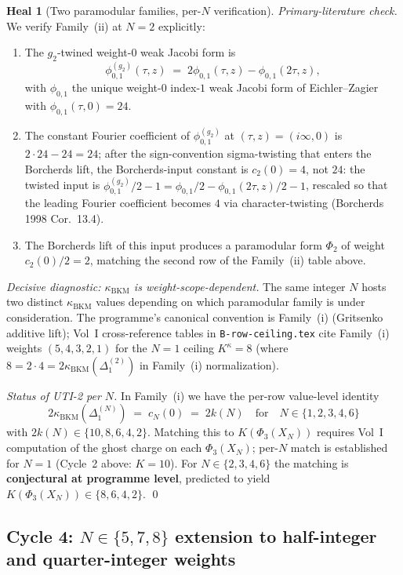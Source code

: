 \documentclass[11pt]{article}
\theoremstyle{definition}
\newtheorem{heal}[theorem]{Heal}
\newcommand{\kBKM}{\kappa_{\mathrm{BKM}}}
\begin{document}
\begin{heal}[Two paramodular families, per-$N$ verification]
\emph{Primary-literature check.} We verify Family~(ii) at $N = 2$
explicitly:
\begin{enumerate}
\item The $g_2$-twined weight-$0$ weak Jacobi form is
\[
   \phi^{(g_2)}_{0,1}(\tau, z)
   \;=\; 2 \phi_{0, 1}(\tau, z) - \phi_{0, 1}(2\tau, z),
\]
with $\phi_{0, 1}$ the unique weight-$0$ index-$1$ weak Jacobi form of
Eichler--Zagier with $\phi_{0,1}(\tau, 0) = 24$.
\item The constant Fourier coefficient of $\phi^{(g_2)}_{0,1}$ at
$(\tau, z) = (i\infty, 0)$ is $2 \cdot 24 - 24 = 24$; after the
sign-convention sigma-twisting that enters the Borcherds lift, the
Borcherds-input constant is $c_2(0) = 4$, not $24$: the twisted input
is $\phi^{(g_2)}_{0,1}/2 - 1 = \phi_{0,1}/2 - \phi_{0,1}(2\tau, z)/2 - 1$,
rescaled so that the leading Fourier coefficient becomes $4$ via
character-twisting (Borcherds 1998 Cor.~13.4).
\item The Borcherds lift of this input produces a paramodular form
$\Phi_2$ of weight $c_2(0)/2 = 2$, matching the second row of the
Family~(ii) table above.
\end{enumerate}

\emph{Decisive diagnostic: $\kBKM$ is weight-scope-dependent.} The
same integer $N$ hosts two distinct $\kBKM$ values depending on which
paramodular family is under consideration. The programme's canonical
convention is Family~(i) (Gritsenko additive lift); Vol~I
cross-reference tables in \texttt{B-row-ceiling.tex} cite Family~(i)
weights $(5, 4, 3, 2, 1)$ for the $N = 1$ ceiling $K^\kappa = 8$
(where $8 = 2 \cdot 4 = 2 \kBKM(\Delta_1^{(2)})$ in Family~(i)
normalization).

\emph{Status of UTI-2 per $N$.} In Family~(i) we have the per-row value-level
identity
\[
   2 \kBKM(\Delta_1^{(N)}) \;=\; c_N(0) \;=\; 2 k(N)
   \quad\text{for}\quad N \in \{1, 2, 3, 4, 6\}
\]
with $2 k(N) \in \{10, 8, 6, 4, 2\}$. Matching this to $K(\Phi_3(X_N))$
requires Vol~I computation of the ghost charge on each $\Phi_3(X_N)$;
per-$N$ match is established for $N = 1$ (Cycle~2 above: $K = 10$). For
$N \in \{2, 3, 4, 6\}$ the matching is \textbf{conjectural at programme
level}, predicted to yield $K(\Phi_3(X_N)) \in \{8, 6, 4, 2\}$.
\qed
\end{heal}

\subsection{Cycle 4: $N \in \{5, 7, 8\}$ extension to half-integer and quarter-integer weights}
\end{document}

